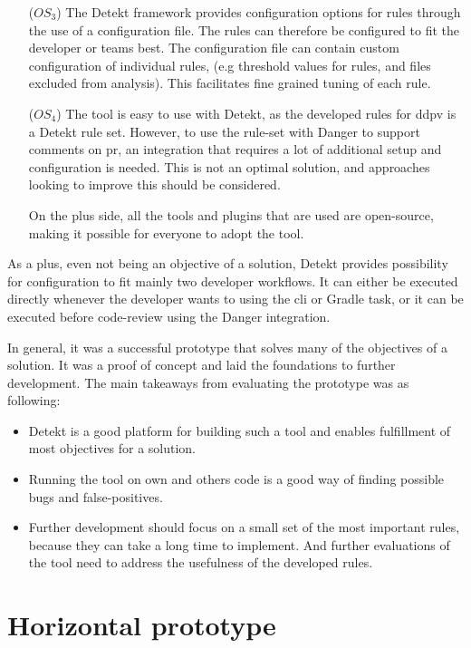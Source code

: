 \documentclass[pdftex,10pt,b5paper,twoside]{report}
\begin{document}
\begin{itemize}
    \item [(\(OS_{3}\))] The Detekt framework provides configuration options for rules through the use of a configuration file. The rules can therefore be configured to fit the developer or teams best. The configuration file can contain custom configuration of individual rules, (e.g threshold values for rules, and files excluded from analysis). This facilitates fine grained tuning of each rule.  \label{vertical-os3}
    
    \item [(\(OS_{4}\))] The tool is easy to use with Detekt, as the developed rules for \gls{ddpv} is a Detekt rule set. However, to use the rule-set with Danger to support comments on \gls{pr}, an integration that requires a lot of additional setup and configuration is needed. This is not an optimal solution, and approaches looking to improve this should be considered. 
    
    On the plus side, all the tools and plugins that are used are open-source, making it possible for everyone to adopt the tool. \label{vertical-os4}

\end{itemize}

As a plus, even not being an objective of a solution, Detekt provides possibility for configuration to fit mainly two developer workflows. It can either be executed directly whenever the developer wants to using the \gls{cli} or Gradle task, or it can be executed before code-review using the Danger integration.

In general, it was a successful prototype that solves many of the objectives of a solution. It was a proof of concept and laid the foundations to further development. The main takeaways from evaluating the prototype was as following:
\begin{itemize}
    \item Detekt is a good platform for building such a tool and enables fulfillment of most objectives for a solution.
    \item Running the tool on own and others code is a good way of finding possible bugs and false-positives.
    \item Further development should focus on a small set of the most important rules, because they can take a long time to implement. And further evaluations of the tool need to address the usefulness of the developed rules.
\end{itemize}

\section{Horizontal prototype}
\label{horizontal-prototype}
\end{document}
